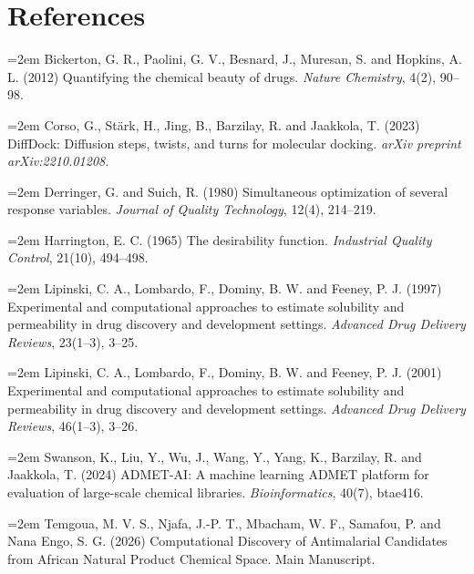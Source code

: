 \documentclass[journal=jcisd8,manuscript=suppinfo]{achemso}
\begin{document}
\section*{References}

\noindent\hangindent=2em Bickerton, G. R., Paolini, G. V., Besnard, J., Muresan, S. and Hopkins, A. L. (2012) Quantifying the chemical beauty of drugs. \textit{Nature Chemistry}, 4(2), 90--98.

\noindent\hangindent=2em Corso, G., Stärk, H., Jing, B., Barzilay, R. and Jaakkola, T. (2023) DiffDock: Diffusion steps, twists, and turns for molecular docking. \textit{arXiv preprint arXiv:2210.01208}.

\noindent\hangindent=2em Derringer, G. and Suich, R. (1980) Simultaneous optimization of several response variables. \textit{Journal of Quality Technology}, 12(4), 214--219.

\noindent\hangindent=2em Harrington, E. C. (1965) The desirability function. \textit{Industrial Quality Control}, 21(10), 494--498.

\noindent\hangindent=2em Lipinski, C. A., Lombardo, F., Dominy, B. W. and Feeney, P. J. (1997) Experimental and computational approaches to estimate solubility and permeability in drug discovery and development settings. \textit{Advanced Drug Delivery Reviews}, 23(1--3), 3--25.

\noindent\hangindent=2em Lipinski, C. A., Lombardo, F., Dominy, B. W. and Feeney, P. J. (2001) Experimental and computational approaches to estimate solubility and permeability in drug discovery and development settings. \textit{Advanced Drug Delivery Reviews}, 46(1--3), 3--26.

\noindent\hangindent=2em Swanson, K., Liu, Y., Wu, J., Wang, Y., Yang, K., Barzilay, R. and Jaakkola, T. (2024) ADMET-AI: A machine learning ADMET platform for evaluation of large-scale chemical libraries. \textit{Bioinformatics}, 40(7), btae416.

\noindent\hangindent=2em Temgoua, M. V. S., Njafa, J.-P. T., Mbacham, W. F., Samafou, P. and Nana Engo, S. G. (2026) Computational Discovery of Antimalarial Candidates from African Natural Product Chemical Space. Main Manuscript.
\end{document}
